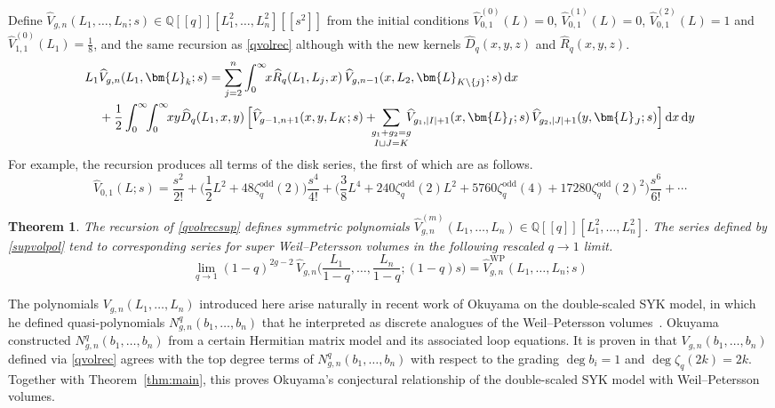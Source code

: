\documentclass[a4paper]{article}
\theoremstyle{plain}
\newtheorem{theorem}{Theorem}
\theoremstyle{definition}
\newcommand{\dd}{\mathrm{d}}
\newcommand{\LL}{\bm{L}}
\newcommand{\bq}{\mathbb{Q}}
\begin{document}
Define $\widehat{V}_{g,n}(L_1, \ldots, L_n;s) \in\bq[[q]] [L_1^2, \ldots, L_n^2] [[s^2]]$ from the initial conditions $\widehat{V}^{(0)}_{0,1}(L) = 0$, $\widehat{V}^{(1)}_{0,1}(L) = 0$, $\widehat{V}^{(2)}_{0,1}(L) = 1$ and $\widehat{V}^{(0)}_{1,1}(L_1)=\frac{1}{8}$, and the same recursion as \cref{qvolrec} although with the new kernels $\widehat{D}_q(x,y,z)$ and $\widehat{R}_q(x,y,z)$.
\begin{align}
L_1 &\widehat{V}_{g,n}(L_1, \LL_k;s) = \sum_{j=2}^n \int_0^\infty \!\! x \widehat{R}_q(L_1,L_j,x) \, \widehat{V}_{g,n-1}(x, L_2, \LL_{K \setminus \{j\}};s) \, \dd x \notag \\
&+ \frac{1}{2} \int_0^\infty \!\! \int_0^\infty \!\! xy \widehat{D}_q(L_1,x,y) \, \Big[ \widehat{V}_{g-1,n+1}(x,y,L_K;s) +\hspace{-2mm} \mathop{\sum_{g_1+g_2=g}}_{I \sqcup J = K} \hspace{-2mm}\widehat{V}_{g_1,|I|+1}(x, \LL_I;s) \, \widehat{V}_{g_2,|J|+1}(y, \LL_J;s) \Big] \, \dd x \, \dd y \label{qvolrecsup}
\end{align}
For example, the recursion produces all terms of the disk series, the first of which are as follows.
\[
\widehat{V}_{0,1}(L; s) = \frac{s^2}{2!} + \bigg( \frac{1}{2}L^2 + 48\zeta^{\mathrm{odd}}_q(2) \bigg) \frac{s^4}{4!} + \bigg( \frac{3}{8} L^4 + 240\zeta^{\mathrm{odd}}_q(2) L^2 +5760\zeta^{\mathrm{odd}}_q(4) + 17280\zeta^{\mathrm{odd}}_q(2)^2 \bigg) \frac{s^6}{6!} + \cdots
\]


\begin{theorem} \label{super}
The recursion of \cref{qvolrecsup} defines symmetric polynomials $\widehat{V}_{g,n}^{(m)}(L_1, \ldots, L_n) \in \bq[[q]] [L_1^2, \ldots, L_n^2]$. The series defined by \cref{supvolpol} tend to corresponding series for super Weil--Petersson volumes in the following rescaled $q\to 1$ limit.
\[
\lim_{q \to 1} (1-q)^{2g-2} \, \widehat{V}_{g,n}\Big( \frac{L_1}{1-q}, \ldots, \frac{L_n}{1-q}; (1-q)s \Big) = \widehat{V}^{\mathrm{WP}}_{g,n}(L_1, \ldots, L_n; s)
\]
\end{theorem}


The polynomials $V_{g,n}(L_1, \ldots, L_n)$ introduced here arise naturally in recent work of Okuyama on the double-scaled SYK model, in which he defined quasi-polynomials $N^q_{g,n}(b_1, \ldots, b_n)$ that he interpreted as discrete analogues of the Weil--Petersson volumes~\cite{OkuDis}.  Okuyama constructed $N^q_{g,n}(b_1, \ldots, b_n)$ from a certain Hermitian matrix model and its associated loop equations.  It is proven in \cite{DNoDou} that $V_{g,n}(b_1, \ldots, b_n)$ defined via \eqref{qvolrec} agrees with the top degree terms of $N^q_{g,n}(b_1, \ldots, b_n)$ with respect to the grading $\deg b_i=1$ and $\deg\zeta_q(2k)=2k$.  Together with Theorem~\ref{thm:main}, this proves Okuyama's conjectural relationship of the double-scaled SYK model with Weil--Petersson volumes.
\end{document}

